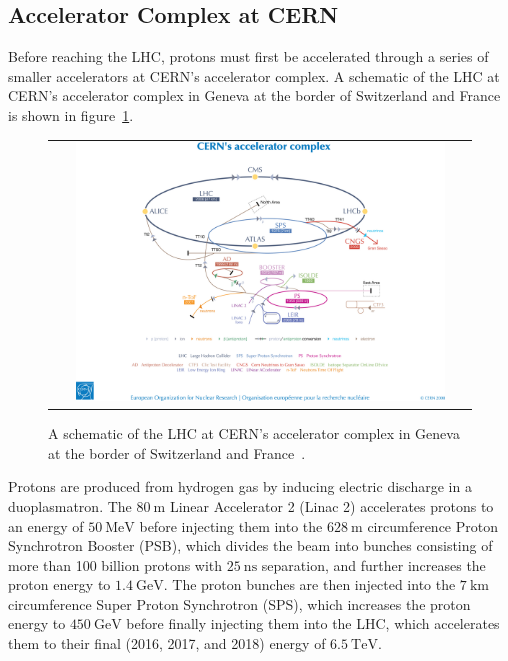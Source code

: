 \subsection{Accelerator Complex at CERN}
Before reaching the LHC, protons must first be accelerated through a series of smaller accelerators at CERN's accelerator complex.
A schematic of the LHC at CERN's accelerator complex in Geneva at the border of Switzerland and France is shown in figure~\ref{CERN_LHC}.
\begin{figure}[!htb]
  \begin{center}
    \begin{tabular}{c}
        \includegraphics[width=0.9\textwidth]{fig_LHC_CMS/CERN_LHC.png}
    \end{tabular}
    \caption{A schematic of the LHC at CERN's accelerator complex in Geneva at the border of Switzerland and France~\cite{Christiane:1260465}.
            }
    \label{CERN_LHC}
  \end{center}
\end{figure}
Protons are produced from hydrogen gas by inducing electric discharge in a duoplasmatron.
The $\SI{80}{\m}$ Linear Accelerator 2 (Linac 2) accelerates protons to an energy of $\SI{50}{\MeV}$ before injecting them into the $\SI{628}{\m}$ circumference Proton Synchrotron Booster (PSB), which divides the beam into bunches consisting of more than 100 billion protons with $\SI{25}{\ns}$ separation, and further increases the proton energy to $\SI{1.4}{\GeV}$.
The proton bunches are then injected into the $\SI{7}{\km}$ circumference Super Proton Synchrotron (SPS), which increases the proton energy to $\SI{450}{\GeV}$ before finally injecting them into the LHC, which accelerates them to their final (2016, 2017, and 2018) energy of $\SI{6.5}{\TeV}$.
